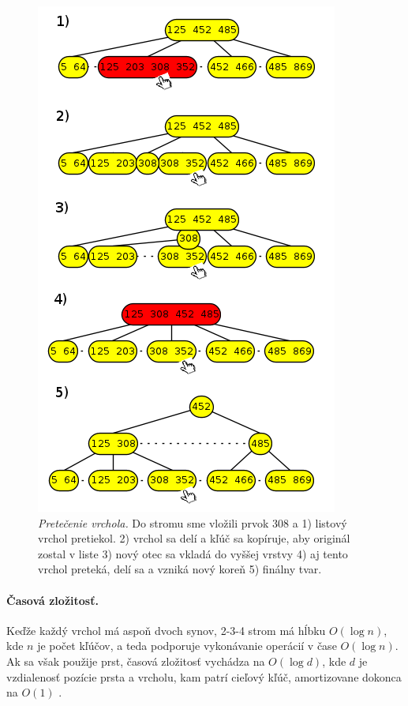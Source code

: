 \begin{figure}
\includegraphics[width=\columnwidth]{obrazky/finger-insert.png}
\caption{\emph{Pretečenie vrchola.} Do stromu sme vložili prvok $308$ a 1) listový vrchol pretiekol. 
2) vrchol sa delí a kľúč sa kopíruje, aby originál zostal v liste 3) nový otec sa vkladá do vyššej vrstvy 
4) aj tento vrchol preteká, delí sa a vzniká nový koreň 5) finálny tvar.}
\label{img:finger-insert}
\end{figure}

\paragraph{Časová zložitosť.}
Keďže každý vrchol má aspoň dvoch synov, 2-3-4 strom má hĺbku $O(\log n)$, kde $n$ je počet kľúčov, 
a teda podporuje vykonávanie operácií v čase $O(\log n)$. Ak sa však použije prst, časová zložitosť 
vychádza na $O(\log d)$, kde $d$ je vzdialenosť pozície prsta a vrcholu, kam patrí cieľový kľúč, 
amortizovane dokonca na $O(1)$ \citet{sahni}. 


